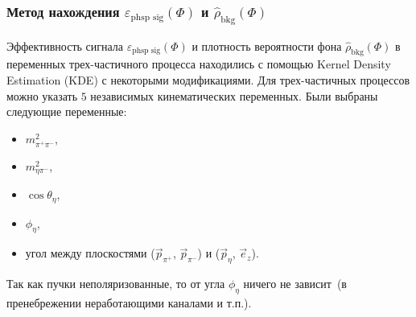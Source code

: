 \documentclass{beamer}
\begin{document}
  \begin{frame}
  \frametitle{Метод нахождения $\varepsilon_{\text{phsp sig}}(\Phi)$ и $\hat{\rho}_{\text{bkg}}(\Phi)$}
  \scriptsize
  Эффективность сигнала $\varepsilon_{\text{phsp sig}}(\Phi)$ и плотность вероятности фона
  $\hat{\rho}_{\text{bkg}}(\Phi)$ в переменных трех-частичного процесса находились с
  помощью Kernel Density Estimation (KDE) с некоторыми
  модификациями. Для трех-частичных процессов можно
  указать $5$ независимых кинематических переменных. Были выбраны следующие
  переменные:
  \begin{itemize}
  \item $m^2_{\pi^+\pi^-}$,
  \item $m^2_{\eta\pi^-}$,
  \item $\cos\theta_{\eta}$,
  \item $\phi_{\eta}$,
  \item угол между плоскостями ($\vec{p}_{\pi^+}$, $\vec{p}_{\pi^-}$) и ($\vec{p}_{\eta}$, $\vec{e}_z$).
  \end{itemize}
  Так как пучки неполяризованные, то от угла $\phi_{\eta}$ ничего не зависит~(в
  пренебрежении неработающими каналами и т.п.).
\end{frame}
\end{document}
